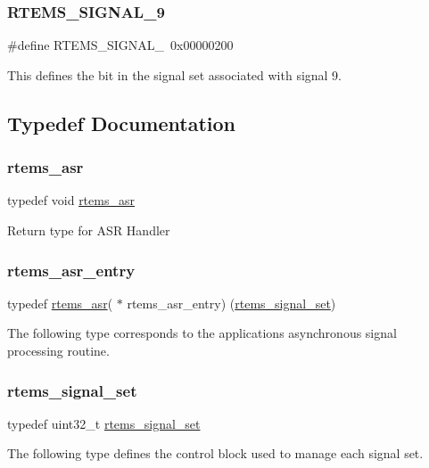 \subsubsection{\texorpdfstring{RTEMS\_SIGNAL\_9}{RTEMS\_SIGNAL\_9}}
{\footnotesize\ttfamily \#define R\+T\+E\+M\+S\+\_\+\+S\+I\+G\+N\+A\+L\+\_~0x00000200}

This defines the bit in the signal set associated with signal 9. 

\subsection{Typedef Documentation}
\mbox{\label{group__ClassicASR_gaa19dbf6435861a92292e35cabea675fb}} 
\subsubsection{\texorpdfstring{rtems\_asr}{rtems\_asr}}
{\footnotesize\ttfamily typedef void \mbox{\hyperlink{group__ClassicASR_gaa19dbf6435861a92292e35cabea675fb}{rtems\+\_\+asr}}}

Return type for A\+SR Handler \mbox{\label{group__ClassicASR_ga7277136adc52f70cdfd49c687ce37732}} 
\subsubsection{\texorpdfstring{rtems\_asr\_entry}{rtems\_asr\_entry}}
{\footnotesize\ttfamily typedef \mbox{\hyperlink{group__ClassicASR_gaa19dbf6435861a92292e35cabea675fb}{rtems\+\_\+asr}}( $\ast$ rtems\+\_\+asr\+\_\+entry) (\mbox{\hyperlink{group__ClassicASR_gae494c868e6d04d19b2f403bb51de98eb}{rtems\+\_\+signal\+\_\+set}})}

The following type corresponds to the applications asynchronous signal processing routine. \mbox{\label{group__ClassicASR_gae494c868e6d04d19b2f403bb51de98eb}} 
\subsubsection{\texorpdfstring{rtems\_signal\_set}{rtems\_signal\_set}}
{\footnotesize\ttfamily typedef uint32\+\_\+t \mbox{\hyperlink{group__ClassicASR_gae494c868e6d04d19b2f403bb51de98eb}{rtems\+\_\+signal\+\_\+set}}}

The following type defines the control block used to manage each signal set. 